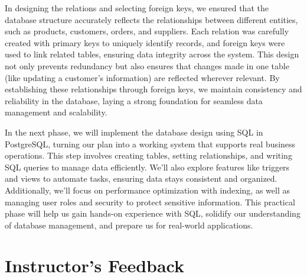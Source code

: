 \documentclass[11pt]{article}
\begin{document}
In designing the relations and selecting foreign keys, we ensured that the database structure accurately reflects the relationships between different entities, such as products, customers, orders, and suppliers. Each relation was carefully created with primary keys to uniquely identify records, and foreign keys were used to link related tables, ensuring data integrity across the system. This design not only prevents redundancy but also ensures that changes made in one table (like updating a customer's information) are reflected wherever relevant. By establishing these relationships through foreign keys, we maintain consistency and reliability in the database, laying a strong foundation for seamless data management and scalability.

In the next phase, we will implement the database design using SQL in PostgreSQL, turning our plan into a working system that supports real business operations. This step involves creating tables, setting relationships, and writing SQL queries to manage data efficiently. We'll also explore features like triggers and views to automate tasks, ensuring data stays consistent and organized. Additionally, we'll focus on performance optimization with indexing, as well as managing user roles and security to protect sensitive information. This practical phase will help us gain hands-on experience with SQL, solidify our understanding of database management, and prepare us for real-world applications.

\section{Instructor's Feedback}
\end{document}
